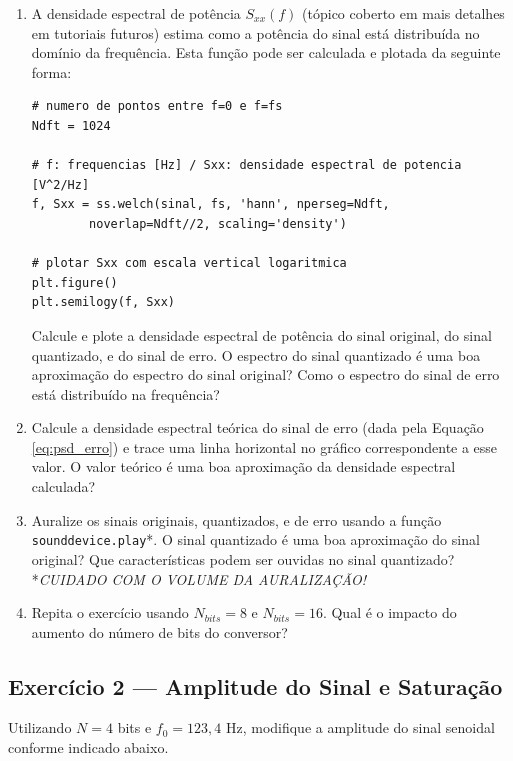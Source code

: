 \documentclass[a4paper,twoside,12pt]{article}
\begin{document}
\begin{enumerate}
		\item A densidade espectral de potência $S_{xx}(f)$ (tópico coberto em mais detalhes em tutoriais futuros) estima como a potência do sinal está distribuída no domínio da frequência. Esta função pode ser calculada e plotada da seguinte forma:
		
\begin{lstlisting}[frame=single]
# numero de pontos entre f=0 e f=fs
Ndft = 1024

# f: frequencias [Hz] / Sxx: densidade espectral de potencia [V^2/Hz]
f, Sxx = ss.welch(sinal, fs, 'hann', nperseg=Ndft,
        noverlap=Ndft//2, scaling='density')

# plotar Sxx com escala vertical logaritmica
plt.figure()
plt.semilogy(f, Sxx)
\end{lstlisting} 
		Calcule e plote a densidade espectral de potência do sinal original, do sinal quantizado, e do sinal de erro. O espectro do sinal quantizado é uma boa aproximação do espectro do sinal original? Como o espectro do sinal de erro está distribuído na frequência?
		
		\item Calcule a densidade espectral teórica do sinal de erro (dada pela Equação \ref{eq:psd_erro}) e trace uma linha horizontal no gráfico correspondente a esse valor. O valor teórico é uma boa aproximação da densidade espectral calculada?
	
		\item Auralize os sinais originais, quantizados, e de erro usando a função {\tt sounddevice.play}*. O sinal quantizado é uma boa aproximação do sinal original? Que características podem ser ouvidas no sinal quantizado?\\
		*\emph{CUIDADO COM O VOLUME DA AURALIZAÇÃO!}
		
		\item Repita o exercício usando $N_{bits}=8$ e $N_{bits}=16$. Qual é o impacto do aumento do número de bits do conversor?
	
	\end{enumerate}

	\subsection{Exercício 2 — Amplitude do Sinal e Saturação}
	\label{sec:ex2}
	
	Utilizando $N = 4$ bits e $f_0 = 123{,}4$ Hz, modifique a amplitude do sinal senoidal conforme indicado abaixo.
	
\end{document}
